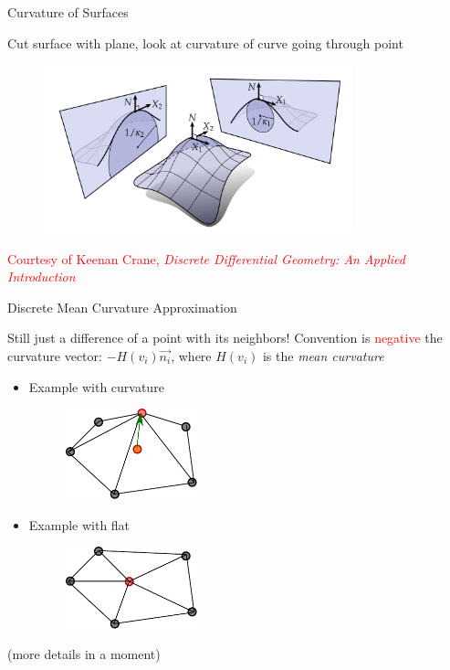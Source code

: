 \documentclass{beamer}
\begin{document}
\begin{frame}{Curvature of Surfaces}

Cut surface with plane, look at curvature of curve going through point

\begin{figure}[t]
    \includegraphics[width=0.8\textwidth]{MeanCurvature.png}
\end{figure}

\small \textcolor{red}{Courtesy of Keenan Crane, {\em Discrete Differential Geometry: An Applied Introduction}}

\end{frame}

\begin{frame}{Discrete Mean Curvature Approximation}

Still just a difference of a point with its neighbors! Convention is \textcolor{red}{negative} the curvature vector: $-H(v_i) \vec{n_i}$, where $H(v_i)$ is the {\em mean curvature}

\begin{itemize}
\item Example with curvature
\begin{figure}[t]
    \includegraphics[width=0.36\textwidth]{2DDiscreteCurvature.pdf}
    
\end{figure}

\item Example with flat
\begin{figure}[t]
    \includegraphics[width=0.36\textwidth]{2DFlat.pdf}
\end{figure}

\end{itemize}

(more details in a moment)

\end{frame}
\end{document}
